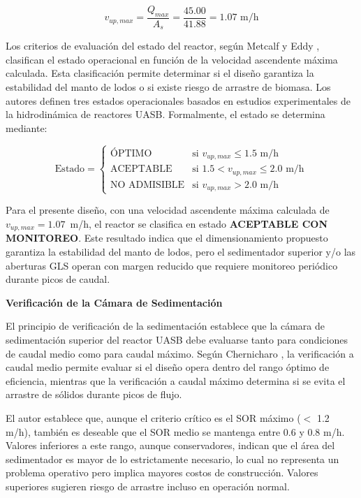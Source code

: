 \begin{equation}
v_{up,max} = \frac{Q_{max}}{A_s} = \frac{45.00}{41.88} = 1.07 \text{ m/h}
\end{equation}

Los criterios de evaluación del estado del reactor, según Metcalf y Eddy \cite{metcalf2014}, clasifican el estado operacional en función de la velocidad ascendente máxima calculada. Esta clasificación permite determinar si el diseño garantiza la estabilidad del manto de lodos o si existe riesgo de arrastre de biomasa. Los autores definen tres estados operacionales basados en estudios experimentales de la hidrodinámica de reactores UASB. Formalmente, el estado se determina mediante:

\begin{equation}
\text{Estado} = \begin{cases}
    \text{ÓPTIMO} & \text{si } v_{up,max} \leq 1.5 \text{ m/h} \\
    \text{ACEPTABLE} & \text{si } 1.5 < v_{up,max} \leq 2.0 \text{ m/h} \\
    \text{NO ADMISIBLE} & \text{si } v_{up,max} > 2.0 \text{ m/h}
\end{cases}
\end{equation}

Para el presente diseño, con una velocidad ascendente máxima calculada de $v_{up,max} = 1.07$~m/h, el reactor se clasifica en estado \textbf{ACEPTABLE CON MONITOREO}. Este resultado indica que el dimensionamiento propuesto garantiza la estabilidad del manto de lodos, pero el sedimentador superior y/o las aberturas GLS operan con margen reducido que requiere monitoreo periódico durante picos de caudal.

\textbf{Verificación de la Cámara de Sedimentación}

El principio de verificación de la sedimentación establece que la cámara de sedimentación superior del reactor UASB debe evaluarse tanto para condiciones de caudal medio como para caudal máximo. Según Chernicharo \cite{chernicharo2007}, la verificación a caudal medio permite evaluar si el diseño opera dentro del rango óptimo de eficiencia, mientras que la verificación a caudal máximo determina si se evita el arrastre de sólidos durante picos de flujo.

El autor establece que, aunque el criterio crítico es el SOR máximo ($<$ 1.2 m/h), también es deseable que el SOR medio se mantenga entre 0.6 y 0.8 m/h. Valores inferiores a este rango, aunque conservadores, indican que el área del sedimentador es mayor de lo estrictamente necesario, lo cual no representa un problema operativo pero implica mayores costos de construcción. Valores superiores sugieren riesgo de arrastre incluso en operación normal.

